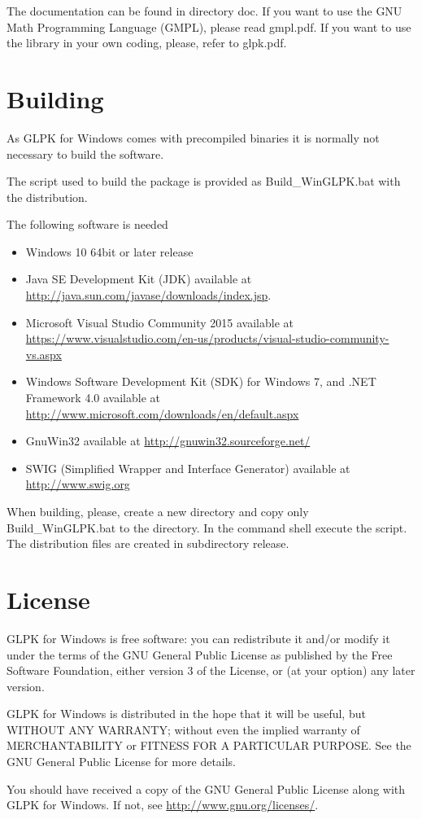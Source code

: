 \documentclass[a4paper,11pt]{report}
\begin{document}
The documentation can be found in directory doc.
If you want to use the GNU Math Programming Language (GMPL), please
read gmpl.pdf.
If you want to use the library in your own coding, please, refer to glpk.pdf.

\chapter{Building}
As GLPK for Windows comes with precompiled binaries it is normally not necessary
to build the software.

The script used to build the package is provided as Build\_WinGLPK.bat with the
distribution.

The following software is needed
\begin{itemize}
\item Windows 10 64bit or later release
\item Java SE Development Kit (JDK) available at
\href{http://java.sun.com/javase/downloads/index.jsp}{http://java.sun.com/javase/downloads/index.jsp}.
\item Microsoft Visual Studio Community 2015 available at
\linebreak\href{https://www.visualstudio.com/en-us/products/visual-studio-community-vs.aspx}{https://www.visualstudio.com/en-us/products/visual-studio-community-vs.aspx}
\item Windows Software Development Kit (SDK) for Windows 7, and .NET Framework
4.0 available at
\href{http://www.microsoft.com/downloads/en/default.aspx}{http://www.microsoft.com/downloads/en/default.aspx}
\item GnuWin32 available at
\href{http://gnuwin32.sourceforge.net/}{http://gnuwin32.sourceforge.net/}
\item SWIG (Simplified Wrapper and Interface Generator)\cite{SWIG}
 available at
\href{http://www.swig.org}{http://www.swig.org}
\end{itemize}
When building, please, create a new directory and copy only Build\_WinGLPK.bat
to the directory. In the command shell execute the script.
The distribution files are created in subdirectory release.
\chapter{License}
GLPK for Windows is free software: you can redistribute it and/or 
modify it under the terms of the GNU General Public License\cite{GPL} as
published by the Free Software Foundation, either version 3 of the 
License, or (at your option) any later version.

GLPK for Windows is distributed in the hope that it will be useful, but 
WITHOUT ANY WARRANTY; without even the implied warranty of  
MERCHANTABILITY or FITNESS FOR A PARTICULAR PURPOSE. See the GNU 
General Public License for more details.

You should have received a copy of the GNU General Public License
along with GLPK for Windows. If not, see 
\href{http://www.gnu.org/licenses/}{http://www.gnu.org/licenses/}.



\newpage
\printindex
\end{document}

